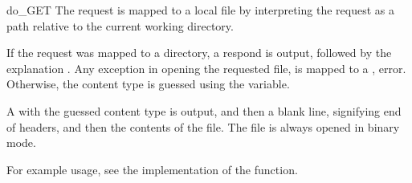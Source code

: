 \begin{methoddesc}{do_GET}{}
The request is mapped to a local file by interpreting the request as
a path relative to the current working directory.

If the request was mapped to a directory, a  respond is output,
followed by the explanation .
Any  exception in opening the requested file, is mapped
to a ,  error. Otherwise, the content
type is guessed using the  variable.

A  with the guessed content type is output, and
then a blank line, signifying end of headers, and then the contents of
the file. The file is always opened in binary mode.

For example usage, see the implementation of the 
function.
\end{methoddesc}


\begin{seealso}
\end{seealso}
